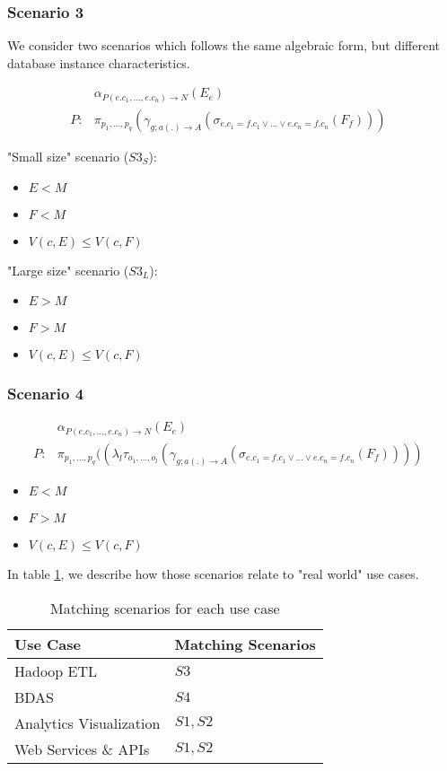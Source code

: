 {\subsubsection{Scenario 3}

We consider two scenarios which follows the same algebraic form, but different database instance characteristics. 

\begin{align}
& \alpha_{P(e.c_1, \dots, e.c_n) \rightarrow N}(E_e) \\
P : & \pi_{p_1,\dots,p_q}(\gamma_{g;a(.) \rightarrow A}(\sigma_{e.c_1 = f.c_1 \vee \dots \vee e.c_n = f.c_n}(F_f)))& \nonumber
\end{align}

"Small size" scenario ($S3_S$):
\begin{itemize}
\item $E < M$
\item $F < M$
\item $V(c,E) \leq V(c,F)$
\end{itemize}

"Large size" scenario ($S3_L$):

\begin{itemize}
\item $E > M$
\item $F > M$
\item $V(c,E) \leq V(c,F)$
\end{itemize}

\subsubsection{Scenario 4}

\begin{align}
& \alpha_{P(e.c_1, \dots, e.c_n) \rightarrow N}(E_e) \\
P : & \pi_{p_1,\dots,p_q}((\lambda_l\tau_{o_1,\dots,o_l}(\gamma_{g;a(.) \rightarrow A}(\sigma_{e.c_1 = f.c_1 \vee \dots \vee e.c_n = f.c_n}(F_f))))& \nonumber
\end{align}

\begin{itemize}
\item $E < M$
\item $F > M$
\item $V(c,E) \leq V(c,F)$
\end{itemize}

In table \ref{tab:matching}, we describe how those scenarios relate to "real world" use cases. 

\begin{table}[]
\centering
\caption{Matching scenarios for each use case}
\label{tab:matching}
\begin{tabular}{|l|l|}
\hline
Use Case               & Matching Scenarios    \\ \hline
Hadoop ETL              & $S3$ \\ \hline
BDAS                    & $S4$ \\ \hline
Analytics Visualization & $S1, S2$ \\ \hline
Web Services \& APIs    & $S1, S2$ \\ \hline
\end{tabular}
\end{table}
}
